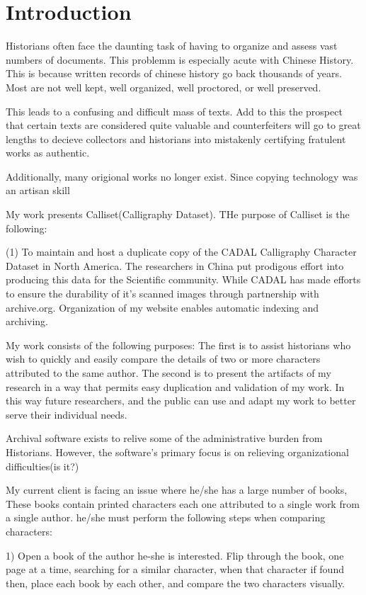 \chapter{Introduction}

Historians often face the daunting task of having to organize and assess vast numbers of documents.  This problemm is especially acute with Chinese History.  This is because written records of chinese history go back thousands of years.  Most are not well kept, well organized, well proctored, or well preserved.

This leads to a confusing and difficult mass of texts.  Add to this the prospect that certain texts are considered quite valuable and counterfeiters will go to great lengths to decieve collectors and historians into mistakenly certifying fratulent works as authentic.

Additionally, many origional works no longer exist.  Since copying technology was an artisan skill 

My work presents Calliset(Calligraphy Dataset).  THe purpose of Calliset is the following:

(1)  To maintain and host a duplicate copy of the CADAL Calligraphy Character Dataset in North America.  The researchers in China put prodigous effort into producing this data for the Scientific community.  While CADAL has made efforts to ensure the durability of it's scanned images through partnership with archive.org.  Organization of my website enables automatic indexing and archiving.


My work consists of the following purposes:
The first is to assist historians who wish to quickly and easily compare the details of two or more characters attributed to the same author.
The second is to present the artifacts of my research in a way that permits easy duplication and validation of my work.  In this way future researchers, and the public can use and adapt my work to better serve their individual needs.

Archival software exists to relive some of the administrative burden from Historians.  However, the software's primary focus is on relieving organizational difficulties(is it?)  

My current client is facing an issue where he/she has a large number of books,  These books contain printed characters each one attributed to a single work from a single author.  he/she must perform the following steps when comparing characters:

1)  Open a book of the author he-she is interested.  Flip through the book, one page at a time, searching for a similar character, when that character if found then, place each book by each other, and compare the two characters visually.

